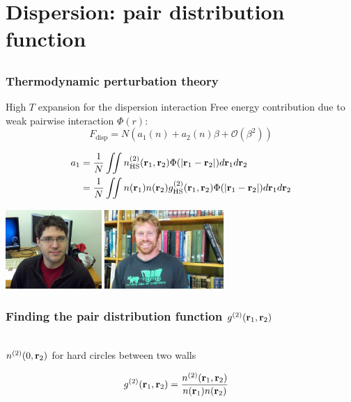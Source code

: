 
\section{Dispersion: pair distribution function}

\subsection{}

\begin{frame}
  \frametitle{Thermodynamic perturbation theory}
  \begin{block}{High $T$ expansion for the dispersion interaction}
    Free energy contribution due to weak pairwise interaction $\Phi(r)$:
    \[
    F_\text{disp} = N\left(a_1(n) + a_2(n)\beta + \mathcal{O}(\beta^2)\right)
    \]
  \end{block}
  \begin{block}{}
    \vspace{-1em}
    \begin{align*}
      a_1 &= \frac1{N}\iint n^{(2)}_{\text{HS}}(\mathbf{r}_1,\mathbf{r}_2)\Phi(|\mathbf{r}_1-\mathbf{r}_2|)d\mathbf{r}_1d\mathbf{r}_2
      \\
      &= \frac1{N}\iint n(\mathbf{r}_1)n(\mathbf{r}_2)g^{(2)}_{\text{HS}}(\mathbf{r}_1,\mathbf{r}_2)\Phi(|\mathbf{r}_1-\mathbf{r}_2|)d\mathbf{r}_1d\mathbf{r}_2
    \end{align*}
  \end{block}
  \begin{center}
    \includegraphics[height=3cm]{figs/paho}
    \includegraphics[height=3cm]{figs/SchulteJeff}
  \end{center}
\end{frame}

\begin{frame}
  \frametitle{Finding the pair distribution function $g^{(2)}(\mathbf{r}_1,\mathbf{r}_2)$}
  \vspace{-0.8em}
  \begin{center}
    \\
    \vspace{-4.0em}
    $n^{(2)}(0,\mathbf{r}_2)$ for hard circles between two walls
  \end{center}
  \begin{align*}
    g^{(2)}(\mathbf{r}_1,\mathbf{r}_2) &= \frac{n^{(2)}(\mathbf{r}_1,\mathbf{r}_2)}{n(\mathbf{r}_1)n(\mathbf{r}_2)}
  \end{align*}
\end{frame}

